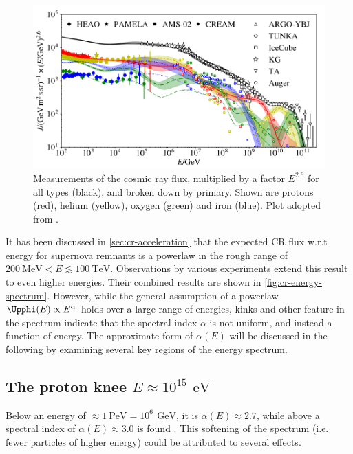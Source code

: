 \begin{figure}
	\centering
	\includegraphics[width=1\textwidth]{./plots/cosmic_ray_spectrum.png}
	\caption{Measurements of the cosmic ray flux, multiplied by a factor $E^{2.6}$ for all types (black), and broken down by primary. Shown are protons (red), 
	helium (yellow), oxygen (green) and iron (blue). Plot adopted from \cite{dembinski2017data}.}
	\label{fig:cr-energy-spectrum}
\end{figure}

It has been discussed in \autoref{sec:cr-acceleration} that the expected CR flux w.r.t energy for supernova remnants is a powerlaw in the rough range of 
$\SI{200}{\mega\electronvolt} < E \lesssim \SI{100}{\tera\electronvolt}$. Observations by various experiments extend this result to even higher energies. Their 
combined results are shown in \autoref{fig:cr-energy-spectrum}. However, while the general assumption of a powerlaw $\Upphi(E)\propto E^\alpha$ holds over a large
range of energies, kinks and other feature in the spectrum indicate that the spectral index $\alpha$ is not uniform, and instead a function of energy. The 
approximate form of $\alpha(E)$ will be discussed in the following by examining several key regions of the energy spectrum. 

\subsection{The proton knee $E\approx 10^{15}\,\SI{}{\electronvolt}$}
\label{ssec:cr-proton-knee}

Below an energy of $\approx \SI{1}{\peta\electronvolt} = 10^6\,\SI{}{\giga\electronvolt}$, it is $\alpha(E)\approx 2.7$, while above a spectral index of 
$\alpha(E)\approx 3.0$ is found \cite{gaisser2016cosmic}. This softening of the spectrum (i.e. fewer particles of higher energy) could be attributed to several
effects.

